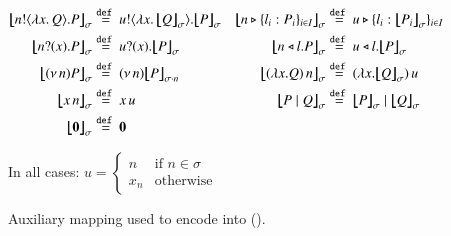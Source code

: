 \begin{figure}[t!]
	\begin{align*}
		\auxmapp{\bout{n}{\abs{x}{Q}} P}{{}}{\sigma} & \defeq \bout{u}{\abs{x}{\auxmapp{Q}{{}}{\sigma}}} \auxmapp{P}{{}}{\sigma}
		&
		\auxmapp{\bbra{n}{l_i:P_i}_{i \in I}}{{}}{\sigma} & \defeq \bbra{u}{l_i:\auxmapp{P_i}{{}}{\sigma}}_{i \in I}		
		\\
		\auxmapp{\binp{n}{x} P}{{}}{\sigma} & \defeq \binp{u}{x} \auxmapp{P}{{}}{\sigma} 
		&
		\auxmapp{\bsel{n}{l} P}{{}}{\sigma} & \defeq \bsel{u}{l} \auxmapp{P}{{}}{\sigma} 
		\\
		\auxmapp{\news{n} P}{{}}{\sigma} & \defeq \news{n} \auxmapp{P}{{}}{{\sigma \cat n}}
		&
		\auxmapp{\appl{(\lambda x.Q)}{n}}{{}}{\sigma}  & \defeq \appl{(\lambda x.\auxmapp{Q}{{}}{\sigma})}{u}
		\\
		\auxmapp{\appl{x}{n}}{{}}{\sigma} & \defeq \appl{x}{u}
		&
				\auxmapp{P \Par Q}{{}}{\sigma} & \defeq \auxmapp{P}{{}}{\sigma} \Par \auxmapp{Q}{{}}{\sigma} 
		\\
		\auxmapp{\inact}{{}}{\sigma}  & \defeq  \inact	
		& 
\end{align*}
\begin{center}
	{In all cases: $u = \begin{cases} n & \text{if $n\in \sigma$} \\ x_n & \text{otherwise} \end{cases}$}
\end{center}
\caption{\label{f:auxmap} Auxiliary mapping used to encode \HOp into \HO ().}
\end{figure}


